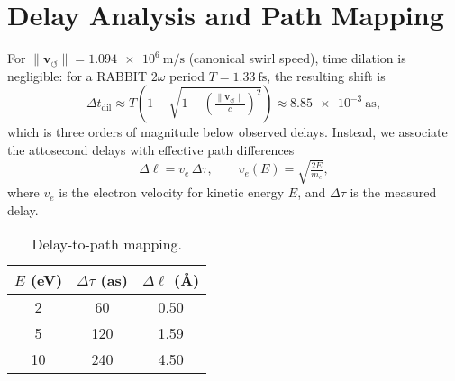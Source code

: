 \documentclass[smallextended]{svjour3}       %
\newcommand{\vnorm}{\lVert \mathbf{v}_{\!\boldsymbol{\circlearrowleft}}\rVert}
\begin{document}
\section{Delay Analysis and Path Mapping}
For $\vnorm = \SI{1.094e6}{\meter\per\second}$ (canonical swirl speed), time dilation is negligible: for a RABBIT $2\omega$ period $T = \SI{1.33}{\femto\second}$, the resulting shift is
\begin{equation}
  \Delta t_{\text{dil}} \approx T\!\left(1 - \sqrt{1 - \left(\tfrac{\vnorm}{c}\right)^2}\right) \approx \SI{8.85e-3}{\atto\second},
\end{equation}
which is three orders of magnitude below observed delays. Instead, we associate the attosecond delays with effective path differences
\begin{equation}
  \Delta \ell = v_e\,\Delta \tau, \qquad v_e(E) = \sqrt{\tfrac{2E}{m_e}},
\end{equation}
where $v_e$ is the electron velocity for kinetic energy $E$, and $\Delta \tau$ is the measured delay.


\begin{table}[h]
  \centering
  \caption{Delay-to-path mapping.}
  \begin{tabular}{@{}ccc@{}}
    \toprule
    $E$ (eV) & $\Delta \tau$ (as) & $\Delta \ell$ (\AA) \\
    \midrule
    2  & 60  & 0.50 \\
    5  & 120 & 1.59 \\
    10 & 240 & 4.50 \\
    \bottomrule
  \end{tabular}
\end{table}
\end{document}
